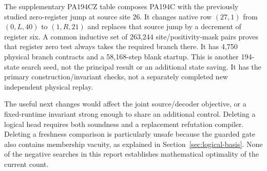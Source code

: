 The supplementary PA194CZ table composes PA194C with the previously studied
zero-register jump at source site 26. It changes native row $(27,1)$ from
$(0,L,40)$ to $(1,R,21)$ and replaces that source jump by a decrement of
register six. A common inductive set of 263,244 site/positivity-mask pairs
proves that register zero test always takes the required branch there.
It has 4,750 physical branch contracts and a 58,168-step blank startup.
This is another 194-state search seed, not the principal result or an
additional state saving. It has the primary construction/invariant checks,
not a separately completed new independent physical replay.

The useful next changes would affect the joint source/decoder objective,
or a fixed-runtime invariant strong enough to share an additional control.
Deleting a logical head requires both soundness and a replacement
refutation compiler. Deleting a freshness comparison is particularly
unsafe because the guarded gate also contains membership vacuity, as
explained in Section~\ref{sec:logical-basis}. None of the negative searches
in this report establishes mathematical optimality of the current count.
